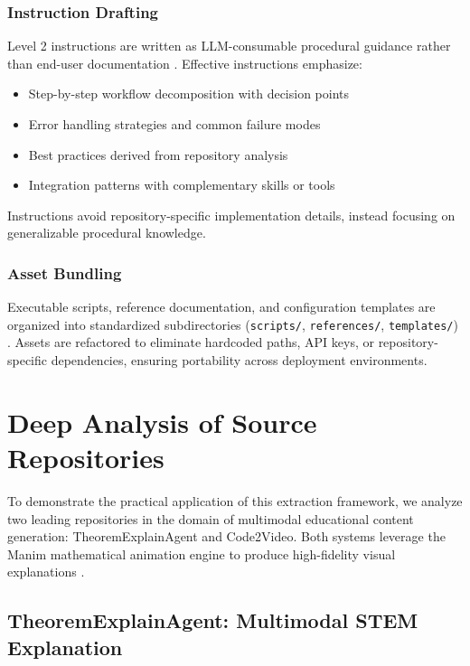 \documentclass[11pt,a4paper]{article}
\begin{document}
\subsubsection{Instruction Drafting}

Level 2 instructions are written as LLM-consumable procedural guidance rather than end-user documentation \cite{lmkit2024agentskills, github2024awesomeskills}. Effective instructions emphasize:

\begin{itemize}
\item Step-by-step workflow decomposition with decision points
\item Error handling strategies and common failure modes
\item Best practices derived from repository analysis
\item Integration patterns with complementary skills or tools
\end{itemize}

Instructions avoid repository-specific implementation details, instead focusing on generalizable procedural knowledge.

\subsubsection{Asset Bundling}

Executable scripts, reference documentation, and configuration templates are organized into standardized subdirectories (\texttt{scripts/}, \texttt{references/}, \texttt{templates/}) \cite{microsoft2024skillsdk, lobehub2024selfimproving}. Assets are refactored to eliminate hardcoded paths, API keys, or repository-specific dependencies, ensuring portability across deployment environments.

\section{Deep Analysis of Source Repositories}\label{sec:deep-analysis}

To demonstrate the practical application of this extraction framework, we analyze two leading repositories in the domain of multimodal educational content generation: TheoremExplainAgent and Code2Video. Both systems leverage the Manim mathematical animation engine to produce high-fidelity visual explanations \cite{teaproject2024, arxiv2024code2video, researchgate2024tea}.

\subsection{TheoremExplainAgent: Multimodal STEM Explanation}\label{sec:tea}
\end{document}
